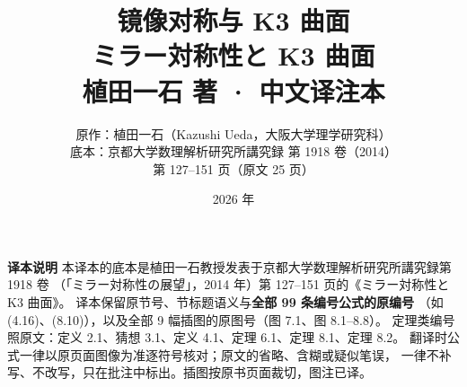 

\title{\bfseries 镜像对称与 K3 曲面\\[6pt]
  \large\mdseries ミラー対称性と K3 曲面\\[2pt]
  \large\mdseries 植田一石 著 · 中文译注本}
\author{原作：植田一石（Kazushi Ueda，大阪大学理学研究科）\\[2pt]
  \small 底本：京都大学数理解析研究所講究録 第 1918 卷（2014）\\
  \small 第 127–151 页（原文 25 页）}
\date{2026 年}


\maketitle
\thispagestyle{empty}

\vspace{1em}
\begin{center}
\begin{minipage}{0.86\textwidth}
\small
\textbf{译本说明}\quad
本译本的底本是植田一石教授发表于京都大学数理解析研究所講究録第 1918 卷
（「ミラー対称性の展望」，2014 年）第 127–151 页的《ミラー対称性と K3 曲面》。
译本保留原节号、节标题语义与\textbf{全部 99 条编号公式的原编号}
（如 (4.16)、(8.10)），以及全部 9 幅插图的原图号（图 7.1、图 8.1–8.8）。
定理类编号照原文：定义 2.1、猜想 3.1、定义 4.1、定理 6.1、定理 8.1、定理 8.2。
翻译时公式一律以原页面图像为准逐符号核对；原文的省略、含糊或疑似笔误，
一律不补写、不改写，只在批注中标出。插图按原书页面裁切，图注已译。
\end{minipage}
\end{center}

\vspace{0.5em}
\clearpage
\tableofcontents
\clearpage



